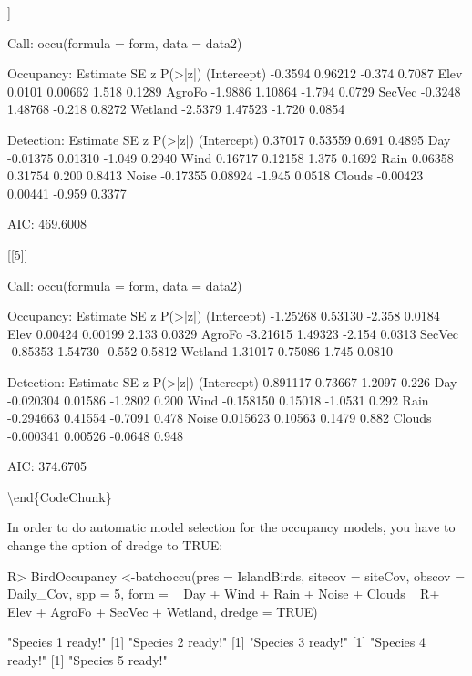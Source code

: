 \documentclass[article]{jss}
\begin{document}
\begin{CodeOutput}
[[4]]

Call:
occu(formula = form, data = data2)

Occupancy:
            Estimate      SE      z P(>|z|)
(Intercept)  -0.3594 0.96212 -0.374  0.7087
Elev          0.0101 0.00662  1.518  0.1289
AgroFo       -1.9886 1.10864 -1.794  0.0729
SecVec       -0.3248 1.48768 -0.218  0.8272
Wetland      -2.5379 1.47523 -1.720  0.0854

Detection:
            Estimate      SE      z P(>|z|)
(Intercept)  0.37017 0.53559  0.691  0.4895
Day         -0.01375 0.01310 -1.049  0.2940
Wind         0.16717 0.12158  1.375  0.1692
Rain         0.06358 0.31754  0.200  0.8413
Noise       -0.17355 0.08924 -1.945  0.0518
Clouds      -0.00423 0.00441 -0.959  0.3377

AIC: 469.6008 

[[5]]

Call:
occu(formula = form, data = data2)

Occupancy:
            Estimate      SE      z P(>|z|)
(Intercept) -1.25268 0.53130 -2.358  0.0184
Elev         0.00424 0.00199  2.133  0.0329
AgroFo      -3.21615 1.49323 -2.154  0.0313
SecVec      -0.85353 1.54730 -0.552  0.5812
Wetland      1.31017 0.75086  1.745  0.0810

Detection:
             Estimate      SE       z P(>|z|)
(Intercept)  0.891117 0.73667  1.2097   0.226
Day         -0.020304 0.01586 -1.2802   0.200
Wind        -0.158150 0.15018 -1.0531   0.292
Rain        -0.294663 0.41554 -0.7091   0.478
Noise        0.015623 0.10563  0.1479   0.882
Clouds      -0.000341 0.00526 -0.0648   0.948

AIC: 374.6705 
\end{CodeOutput}

\textbackslash{}end\{CodeChunk\}

In order to do automatic model selection for the occupancy models, you
have to change the option of dredge to TRUE:

\begin{CodeChunk}

\begin{CodeInput}
R> BirdOccupancy <-batchoccu(pres = IslandBirds, sitecov = siteCov, obscov = Daily_Cov, spp =  5, form = ~ Day + Wind + Rain + Noise + Clouds ~
R+ Elev + AgroFo + SecVec + Wetland, dredge = TRUE)
\end{CodeInput}

\begin{CodeOutput}
[1] "Species 1 ready!"
[1] "Species 2 ready!"
[1] "Species 3 ready!"
[1] "Species 4 ready!"
[1] "Species 5 ready!"
\end{CodeOutput}
\end{CodeChunk}
\end{document}
